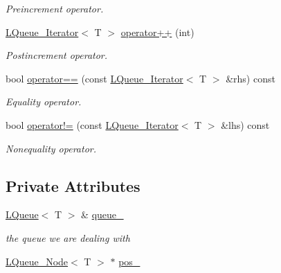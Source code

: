 \begin{DoxyCompactItemize}
\begin{DoxyCompactList}\small\item\em Preincrement operator. \item\end{DoxyCompactList}\item 
\hyperlink{classMadara_1_1Utility_1_1LQueue__Iterator}{LQueue\_\-Iterator}$<$ T $>$ \hyperlink{classMadara_1_1Utility_1_1LQueue__Iterator_add82f68fd289d9918b03583cc010c5c8}{operator++} (int)
\begin{DoxyCompactList}\small\item\em Postincrement operator. \item\end{DoxyCompactList}\item 
bool \hyperlink{classMadara_1_1Utility_1_1LQueue__Iterator_aca160118a05acd0712af61a379d0ef71}{operator==} (const \hyperlink{classMadara_1_1Utility_1_1LQueue__Iterator}{LQueue\_\-Iterator}$<$ T $>$ \&rhs) const 
\begin{DoxyCompactList}\small\item\em Equality operator. \item\end{DoxyCompactList}\item 
bool \hyperlink{classMadara_1_1Utility_1_1LQueue__Iterator_a0bf4ac9ba711d213c149f5ab7fc724dc}{operator!=} (const \hyperlink{classMadara_1_1Utility_1_1LQueue__Iterator}{LQueue\_\-Iterator}$<$ T $>$ \&lhs) const 
\begin{DoxyCompactList}\small\item\em Nonequality operator. \item\end{DoxyCompactList}\end{DoxyCompactItemize}
\subsection*{Private Attributes}
\begin{DoxyCompactItemize}
\item 
\hyperlink{classMadara_1_1Utility_1_1LQueue}{LQueue}$<$ T $>$ \& \hyperlink{classMadara_1_1Utility_1_1LQueue__Iterator_a5c256229e5aac5c26de7d3db9346b11f}{queue\_\-}
\begin{DoxyCompactList}\small\item\em the queue we are dealing with \item\end{DoxyCompactList}\item 
\hyperlink{classMadara_1_1Utility_1_1LQueue__Node}{LQueue\_\-Node}$<$ T $>$ $\ast$ \hyperlink{classMadara_1_1Utility_1_1LQueue__Iterator_ae30b0711f4d78281000641ac3519bba3}{pos\_\-}
\end{DoxyCompactItemize}


